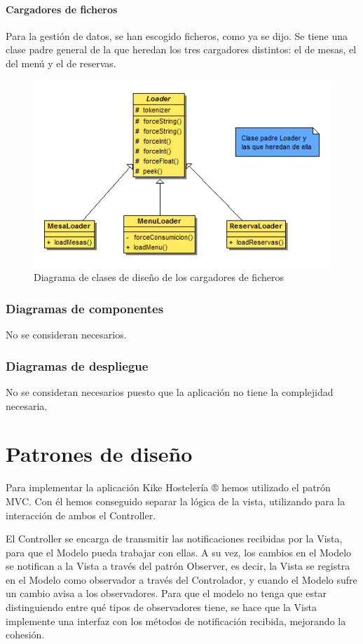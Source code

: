 \documentclass[spanish,a4paper,11pt, twoside]{report}	%
\begin{document}
		\subsection{Cargadores de ficheros}
		Para la gestión de datos, se han escogido ficheros, como ya se dijo. Se tiene una clase padre general de la que heredan los tres cargadores distintos: el de mesas, el del menú y el de reservas.
		\begin{figure}[!h]
		\centering
		\includegraphics[scale=0.5]{DCDloader.png}
		\caption{Diagrama de clases de diseño de los cargadores de ficheros}
		\end{figure}

	\section{Diagramas de componentes}
	No se consideran necesarios.

	\section{Diagramas de despliegue}
	No se consideran necesarios puesto que la aplicación no tiene la complejidad necesaria.





\setcounter{section}{0}
\part{Patrones de diseño}

Para implementar la aplicación Kike Hostelería ® hemos utilizado el patrón MVC.
Con él hemos conseguido separar la lógica de la vista, utilizando para la interacción de ambos el Controller.

El Controller se encarga de transmitir las notificaciones recibidas por la Vista, para que el Modelo pueda trabajar con ellas. A su vez, los cambios en el Modelo se notifican a la Vista a través del patrón Observer, es decir, la Vista se registra en el Modelo como observador a través del Controlador, y cuando el Modelo sufre un cambio avisa a los observadores. Para que el modelo no tenga que estar distinguiendo entre qué tipos de observadores tiene, se hace que la Vista implemente una interfaz con los métodos de notificación recibida, mejorando la cohesión.
\end{document}
